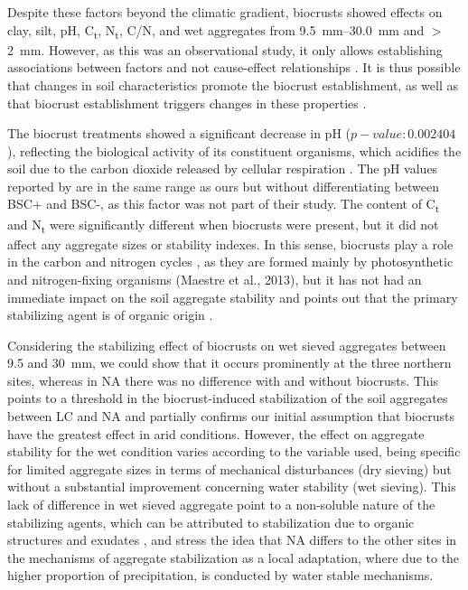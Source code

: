 Despite these factors beyond the climatic gradient, biocrusts showed effects on clay, silt, pH, C\textsubscript{t}, N\textsubscript{t}, C/N, and wet aggregates from \SIrange{9.5}{30.0}{\milli\meter} and $>$\SI{2}{\milli\meter}. However, as this was an observational study, it only allows establishing associations between factors and not cause-effect relationships \citep{Cox1992,Rosenbaum2005}. It is thus possible that changes in soil characteristics promote the biocrust establishment, as well as that biocrust establishment triggers changes in these properties \citep{Belnap2003}.

The biocrust treatments showed a significant decrease in pH ($p-value: 0.002404$), reflecting the biological activity of its constituent organisms, which acidifies the soil due to the carbon dioxide released by cellular respiration \citep{Bachar2010}. The pH values reported by \citet{Bernhard2018} are in the same range as ours but without differentiating between BSC+ and BSC-, as this factor was not part of their study. The content of C\textsubscript{t} and N\textsubscript{t} were significantly different when biocrusts were present, but it did not affect any aggregate sizes or stability indexes. In this sense, biocrusts play a role in the carbon and nitrogen cycles \citep{Chen2000}, as they are formed mainly by photosynthetic and nitrogen-fixing organisms (Maestre et al., 2013), but it has not had an immediate impact on the soil aggregate stability and points out that the primary stabilizing agent is of organic origin \citep{Wagner2007,Six2004}.

Considering the stabilizing effect of biocrusts on wet sieved aggregates between 9.5 and \SI{30}{\milli\meter}, we could show that it occurs prominently at the three northern sites, whereas in NA there was no difference with and without biocrusts. This points to a threshold in the biocrust-induced stabilization of the soil aggregates between LC and NA and partially confirms our initial assumption that biocrusts have the greatest effect in arid conditions. However, the effect on aggregate stability for the wet condition varies according to the variable used, being specific for limited aggregate sizes in terms of mechanical disturbances (dry sieving) but without a substantial improvement concerning water stability (wet sieving). This lack of difference in wet sieved aggregate point to a non-soluble nature of the stabilizing agents, which can be attributed to stabilization due to organic structures and exudates \citep{Rillig2004}, and stress the idea that NA differs to the other sites in the mechanisms of aggregate stabilization as a local adaptation, where due to the higher proportion of precipitation, is conducted by water stable mechanisms.

